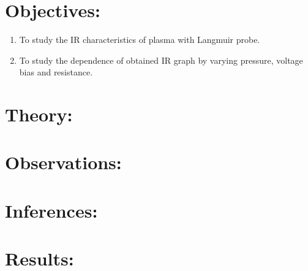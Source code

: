 \documentclass[]{report}[12 pt]
\begin{document}
	

\section*{Objectives:}
\begin{enumerate}
	\item To study the IR characteristics of plasma with Langmuir probe.
	\item To study the dependence of obtained IR graph by varying pressure, voltage bias and resistance.
\end{enumerate}

\section*{Theory:}

\section*{Observations:}

\section*{Inferences:}

\section*{Results:}
\end{document}
